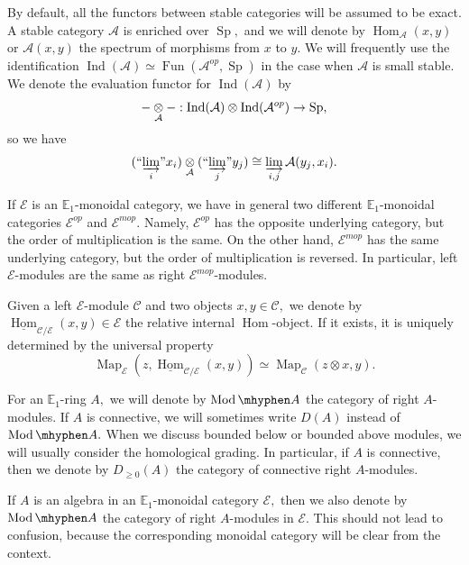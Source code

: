 \documentclass[11pt,leqno]{amsart}
\numberwithin{equation}{section}
\def\Hom{\operatorname{Hom}}
\def\Map{\operatorname{Map}}
\newcommand{\tens}[1]{%
  \mathbin{\mathop{\otimes}\displaylimits_{#1}}%
}
\newcommand{\hy}{\mhyphen}
\newcommand{\indlim}[1][]{\mathop{\varinjlim}\limits_{#1}}
\newcommand{\inddlim}[1][]{{``{\indlim[#1]}"}}
\newcommand{\bE}{{\mathbb E}}
\newcommand{\cA}{{\mathcal A}}
\newcommand{\cC}{{\mathcal C}}
\newcommand{\cE}{{\mathcal E}}
\newcommand{\un}{\underline}
\newcommand{\Fun}{\operatorname{Fun}}
\newcommand{\Sp}{\operatorname{Sp}}
\newcommand{\Ind}{\operatorname{Ind}}
\newcommand{\Mod}{\operatorname{Mod}}
\begin{document}
By default, all the functors between stable categories will be assumed to be exact. A stable category $\cA$ is enriched over $\Sp,$ and we will denote by $\Hom_{\cA}(x,y)$ or $\cA(x,y)$ the spectrum of morphisms from $x$ to $y.$ We will frequently use the identification $\Ind(\cA)\simeq\Fun(\cA^{op},\Sp)$ in the case when $\cA$ is small stable. We denote the evaluation functor for $\Ind(\cA)$ by
\begin{equation*}
-\tens{\cA}-:\Ind(\cA)\otimes\Ind(\cA^{op})\to\Sp,
\end{equation*}
so we have
\begin{equation*}
(\inddlim[i]x_i)\tens{\cA}(\inddlim[j]y_j)\cong \indlim[i,j]\cA(y_j,x_i).
\end{equation*}

If $\cE$ is an $\bE_1$-monoidal category, we have in general two different $\bE_1$-monoidal categories $\cE^{op}$ and $\cE^{mop}.$ Namely, $\cE^{op}$ has the opposite underlying category, but the order of multiplication is the same. On the other hand, $\cE^{mop}$ has the same underlying category, but the order of multiplication is reversed. In particular, left $\cE$-modules are the same as right $\cE^{mop}$-modules.

Given a left $\cE$-module $\cC$ and two objects $x,y\in\cC,$ we denote by $\un{\Hom}_{\cC/\cE}(x,y)\in\cE$ the relative internal $\Hom$-object. If it exists, it is uniquely determined by the universal property
\begin{equation*}
\Map_{\cE}(z,\un{\Hom}_{\cC/\cE}(x,y))\simeq \Map_{\cC}(z\otimes x,y).
\end{equation*}

For an $\bE_1$-ring $A,$ we will denote by $\Mod\hy A$ the category of right $A$-modules. If $A$ is connective, we will sometimes write $D(A)$ instead of $\Mod\hy A.$ When we discuss bounded below or bounded above modules, we will usually consider the homological grading. In particular, if $A$ is connective, then we denote by $D_{\geq 0}(A)$ the category of connective right $A$-modules.

If $A$ is an algebra in an $\bE_1$-monoidal category $\cE,$ then we also denote by $\Mod\hy A$ the category of right $A$-modules in $\cE.$ This should not lead to confusion, because the corresponding monoidal category will be clear from the context.
\end{document}
